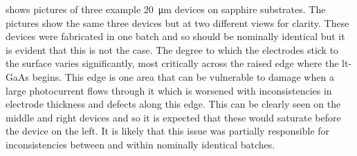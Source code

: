  shows pictures of three example \SI{20}{\micro\metre} devices on sapphire substrates. The pictures show the same three devices but at two different views for clarity. These devices were fabricated in one batch and so should be nominally identical but it is evident that this is not the case. The degree to which the electrodes stick to the surface varies significantly, most critically across the raised edge where the \acrshort{lt}\nobreakdash-GaAs begins. This edge is one area that can be vulnerable to damage when a large photocurrent flows through it which is worsened with inconsistencies in electrode thickness and defects along this edge. This can be clearly seen on the middle and right devices and so it is expected that these would saturate before the device on the left. It is likely that this issue was partially responsible for inconsistencies between and within nominally identical batches.

